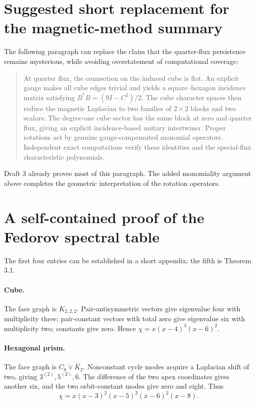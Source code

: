 \documentclass[11pt,a4paper]{article}
\begin{document}
\section{Suggested short replacement for the magnetic-method summary}
The following paragraph can replace the claim that the quarter-flux persistence remains mysterious, while avoiding overstatement of computational coverage:
\begin{quote}
At quarter flux, the connection on the induced cube is flat. An explicit gauge makes all cube edges trivial and yields a square--hexagon incidence matrix satisfying $B^*B=(9I-C^2)/2$. The cube character spaces then reduce the magnetic Laplacian to two families of $2\times2$ blocks and two scalars. The degree-one cube sector has the same block at zero and quarter flux, giving an explicit incidence-based unitary intertwiner. Proper rotations act by genuine gauge-compensated monomial operators. Independent exact computations verify these identities and the special-flux characteristic polynomials.
\end{quote}
Draft 3 already proves most of this paragraph. The added monomiality argument above completes the geometric interpretation of the rotation operators.

\section{A self-contained proof of the Fedorov spectral table}
The first four entries can be established in a short appendix; the fifth is Theorem 3.1.

\paragraph{Cube.} The face graph is $K_{2,2,2}$. Pair-antisymmetric vectors give eigenvalue four with multiplicity three; pair-constant vectors with total zero give eigenvalue six with multiplicity two; constants give zero. Hence $\chi=x(x-4)^3(x-6)^2$.

\paragraph{Hexagonal prism.} The face graph is $C_6\vee\overline{K_2}$. Nonconstant cycle modes acquire a Laplacian shift of two, giving $3^{(2)},5^{(2)},6$. The difference of the two apex coordinates gives another six, and the two orbit-constant modes give zero and eight. Thus
\[
 \chi=x(x-3)^2(x-5)^2(x-6)^2(x-8).
\]
\end{document}
